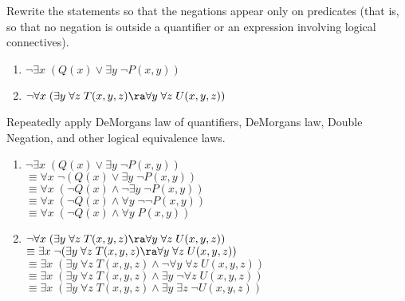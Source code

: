 \begin{questions}
 Rewrite the statements so that the negations appear only on predicates (that is, so that no negation is outside a quantifier or an expression involving logical connectives).
  \begin{enumerate}[label=(\alph*),itemsep=0pt,parsep=0pt,
      topsep=0pt,partopsep=0pt]
      \item $\neg \exists x\; (Q(x) \vee \exists y\; \neg P(x,y))$
      \item $\neg \forall x\; (\exists y\; \forall z\; T(x,y,z) \ra \forall y\; \forall z\; U(x,y,z))$
    \end{enumerate}
    \ifprintanswers
        \vspace{-12pt}
    \fi
  \begin{solution} Repeatedly apply DeMorgans law of quantifiers, DeMorgans law, Double Negation, and other logical equivalence laws.
    \begin{enumerate}[label=(\alph*),itemsep=0pt,parsep=0pt,
        topsep=0pt,partopsep=0pt]
          
        \item $\neg \exists x\; (Q(x) \vee \exists y\; \neg P(x,y))$ \\
          $ \equiv \forall x\; \neg (Q(x) \vee \exists y\; \neg P(x,y))$ \\
          $ \equiv \forall x\; (\neg Q(x) \wedge \neg \exists y\; \neg P(x,y))$ \\
          $\equiv \forall x\; (\neg Q(x) \wedge \forall y\; \neg \neg P(x,y))$ \\
          $ \equiv \forall x\; (\neg Q(x) \wedge \forall y\; P(x,y))$ 
          
        \item $\neg \forall x\; (\exists y\; \forall z\; T(x,y,z) \ra \forall y\; \forall z\; U(x,y,z))$ \\
          $ \equiv \exists x\; \neg (\exists y\; \forall z\; T(x,y,z) \ra \forall y\; \forall z\; U(x,y,z))$ \\
          $ \equiv \exists x\; (\exists y\; \forall z\; T(x,y,z) \wedge \neg \forall y\; \forall z\; U(x,y,z))$ \\
          $ \equiv \exists x\; (\exists y\; \forall z\; T(x,y,z) \wedge \exists y\; \neg \forall z\; U(x,y,z))$ \\
          $ \equiv \exists x\; (\exists y\; \forall z\; T(x,y,z) \wedge \exists y\; \exists z\; \neg U(x,y,z))$ \\
      \end{enumerate}
  \end{solution}




\end{questions}
